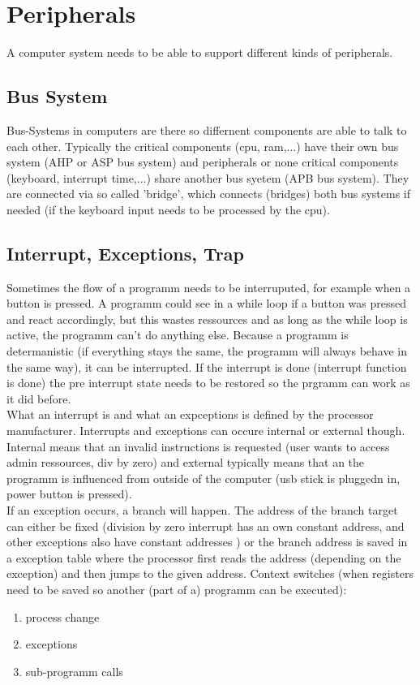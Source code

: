 \documentclass[a4paper]{scrartcl}
\begin{document}
    \section{Peripherals}
        A computer system needs to be able to support different kinds of peripherals. 
            \subsection{Bus System}
            Bus-Systems in computers are there so differnent components are able to talk to each other. Typically the critical components (cpu, ram,...) have 
            their own bus system (AHP or ASP bus system) and peripherals or none critical components (keyboard, interrupt time,...) share another bus syetem (APB bus system).
            They are connected via so called 'bridge', which connects (bridges) both bus systems if needed (if the keyboard input needs to be processed by the cpu). 
            \subsection{Interrupt, Exceptions, Trap}
            Sometimes the flow of a programm needs to be interruputed, for example when a button is pressed. A programm could see in a while loop if a button was pressed and react 
            accordingly, but this wastes ressources and as long as the while loop is active, the programm can't do anything else. Because a programm is determanistic (if everything stays the
            same, the programm will always behave in the same way), it can be interrupted. If the interrupt is done (interrupt function is done) the pre interrupt state needs to be 
            restored so the prgramm can work as it did before. \\
            What an interrupt is and what an expceptions is defined by the processor manufacturer. Interrupts and exceptions can occure internal or external though.
            Internal means that an invalid instructions is requested (user wants to access admin ressources, div by zero) and external typically means that an 
            the programm is influenced from outside of the computer (usb stick is pluggedn in, power button is pressed). \\
            If an exception occurs, a branch will happen. The address of the branch target can either be fixed (division by zero interrupt has an own constant address, and other
            exceptions also have constant addresses ) or the branch address is saved in a exception table where the processor first reads the address (depending on the exception) 
            and then jumps to the given address.
            Context switches (when registers need to be saved so another (part of a) programm can be executed): 
            \begin{enumerate}
                \item process change
                \item exceptions
                \item sub-programm calls
            \end{enumerate}   
\end{document}
